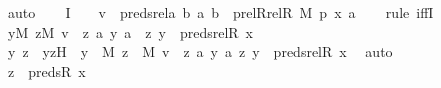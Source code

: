 \begin{isabellebody}
\ auto\isanewline
\ \ \isamarkupfalse%
\ I{}\ {\isacharcolon}{\kern0pt}\ {\isachardoublequoteopen}{\isachardot}{\kern0pt}{\isachardot}{\kern0pt}{\isachardot}{\kern0pt}\ {\isasymlongleftrightarrow}\ v\ {\isasymin}\ preds{\isacharunderscore}{\kern0pt}rel{\isacharparenleft}{\kern0pt}{\isasymlambda}a\ b{\isachardot}{\kern0pt}\ {\isacharless}{\kern0pt}a{\isacharcomma}{\kern0pt}\ b{\isachargreater}{\kern0pt}\ {\isasymin}\ prel{\isacharparenleft}{\kern0pt}Rrel{\isacharparenleft}{\kern0pt}R{\isacharcomma}{\kern0pt}\ M{\isacharparenright}{\kern0pt}{\isacharcomma}{\kern0pt}\ p{\isacharparenright}{\kern0pt}{\isacharcomma}{\kern0pt}\ {\isacharless}{\kern0pt}x{\isacharcomma}{\kern0pt}\ a{\isachargreater}{\kern0pt}{\isacharparenright}{\kern0pt}{\isachardoublequoteclose}\ \isanewline
\ \ \isamarkupfalse%
{\isacharparenleft}{\kern0pt}rule\ iffI{\isacharparenright}{\kern0pt}\isanewline
\ \ \ \ \isamarkupfalse%
\ {\isachardoublequoteopen}{\isasymexists}y{\isasymin}M{\isachardot}{\kern0pt}\ {\isasymexists}z{\isasymin}M{\isachardot}{\kern0pt}\ v\ {\isacharequal}{\kern0pt}\ {\isasymlangle}{\isasymlangle}z{\isacharcomma}{\kern0pt}\ a{\isasymrangle}{\isacharcomma}{\kern0pt}\ y{\isacharcomma}{\kern0pt}\ a{\isasymrangle}\ {\isasymand}\ {\isasymlangle}z{\isacharcomma}{\kern0pt}\ y{\isasymrangle}\ {\isasymin}\ preds{\isacharunderscore}{\kern0pt}rel{\isacharparenleft}{\kern0pt}R{\isacharcomma}{\kern0pt}\ x{\isacharparenright}{\kern0pt}{\isachardoublequoteclose}\ \isanewline
\ \ \ \ \isamarkupfalse%
\ \isamarkupfalse%
\ y\ z\ \ yzH\ {\isacharcolon}{\kern0pt}\ {\isachardoublequoteopen}y\ {\isasymin}\ M{\isachardoublequoteclose}\ {\isachardoublequoteopen}z\ {\isasymin}\ M{\isachardoublequoteclose}\ {\isachardoublequoteopen}v\ {\isacharequal}{\kern0pt}\ {\isacharless}{\kern0pt}{\isacharless}{\kern0pt}z{\isacharcomma}{\kern0pt}\ a{\isachargreater}{\kern0pt}{\isacharcomma}{\kern0pt}\ {\isacharless}{\kern0pt}y{\isacharcomma}{\kern0pt}\ a{\isachargreater}{\kern0pt}{\isachargreater}{\kern0pt}{\isachardoublequoteclose}\ {\isachardoublequoteopen}{\isacharless}{\kern0pt}z{\isacharcomma}{\kern0pt}\ y{\isachargreater}{\kern0pt}\ {\isasymin}\ preds{\isacharunderscore}{\kern0pt}rel{\isacharparenleft}{\kern0pt}R{\isacharcomma}{\kern0pt}\ x{\isacharparenright}{\kern0pt}{\isachardoublequoteclose}\ \isamarkupfalse%
\ auto\ \isanewline
\isanewline
\ \ \ \ \isamarkupfalse%
\ {\isachardoublequoteopen}z\ {\isasymin}\ preds{\isacharparenleft}{\kern0pt}R{\isacharcomma}{\kern0pt}\ x{\isacharparenright}{\kern0pt}{\isachardoublequoteclose}\ \isamarkupfalse%

\end{isabellebody}
